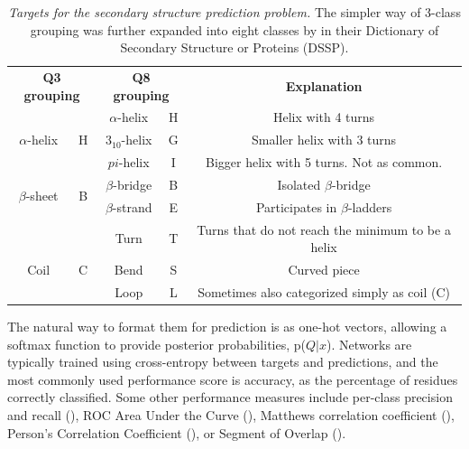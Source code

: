 \begin{table}
	\begin{tabular}{cc|cc|c}
		\multicolumn{2}{c}{\textbf{Q3 grouping}} & \multicolumn{2}{c}{\textbf{Q8 grouping}} &  \textbf{Explanation} \\ 
		&   & $\alpha$-helix & H & Helix with 4 turns \\ 
		$\alpha$-helix    & H & $3_{10}$-helix & G & Smaller helix with 3 turns \\ 
		&   & $pi$-helix      & I & Bigger helix with 5 turns. Not as common.\\ \hline
		\multirow{2}{*}{$\beta$-sheet}    & \multirow{2}{*}{B} & $\beta$-bridge & B & Isolated $\beta$-bridge \\ 
		&                       & $\beta$-strand & E & Participates in $\beta$-ladders \\ \hline
		&   & Turn & T & Turns that do not reach the minimum to be a helix \\ 
		Coil    & C & Bend & S & Curved piece \\ 
		&   & Loop & L & Sometimes also categorized simply as coil (C)
	\end{tabular}
	\caption{\textit{Targets for the secondary structure prediction problem.} The simpler way of 3-class grouping was further expanded into eight classes by \cite{Kabsch1983} in their Dictionary of Secondary Structure or Proteins (DSSP).}
	\label{table:q8}
\end{table}

The natural way to format them for prediction is as one-hot vectors, allowing a softmax function to provide posterior probabilities, p($Q|x$). Networks are typically trained using cross-entropy between targets and predictions, and the most commonly used performance score is accuracy, as the percentage of residues correctly classified. Some other performance measures include per-class precision and recall (\cite{Wang2016}), ROC Area Under the Curve (\cite{Hattori2017}), Matthews correlation coefficient (\cite{Fang2017}), Person's Correlation Coefficient (\cite{Jurtz2017}), or Segment of Overlap (\cite{Wang2016}).

